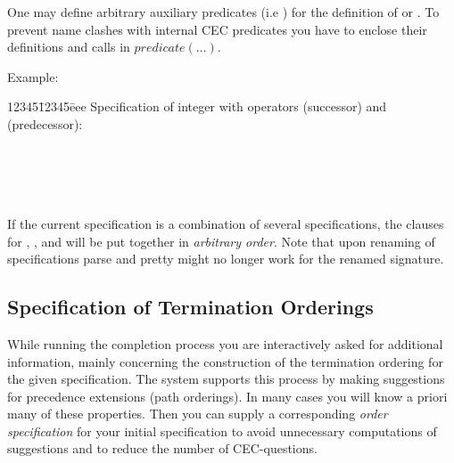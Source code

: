 {\noindent
One may define arbitrary auxiliary predicates (i.e )
for the definition of  or . 
To prevent name clashes with internal CEC predicates
you have to enclose their definitions and calls in $predicate(\ldots)$. \bigskip

Example:\smallskip
\begin{tabbing}
12345\=12345\=eee\kill
\> Specification of integer with operators  (successor) and 
 (predecessor):\\
\\
\> \> \\
\> \> \\
\> \> \\
\> \> 
\end{tabbing}

If the current specification is a combination of several specifications, the clauses for ,
, and  will be put together in
{\em arbitrary order}. Note that upon renaming of specifications parse and
pretty might no longer work for the renamed signature.

\subsection{Specification of Termination Orderings}
\label{OrderSpecification}

\noindent
While running the completion process you are interactively asked for additional
information, mainly
concerning the construction of the termination ordering for the given
specification. The system supports this process by making suggestions for precedence
extensions (path orderings). In many cases you will know a 
priori many of these properties. 
Then you can supply a corresponding {\em order specification} for your
initial specification to avoid unnecessary computations of suggestions 
and to reduce the number of CEC-questions.\bigskip

\begin{syntax}
 \IS {}    
			 \AND [ \nt{orderBase} ] 
			 \AND [ \nt{orderPragmas} ] \END
\\
 \IS  {}
		\OR {} 
		\OR {}
		\OR {}
\end{syntax}

}
